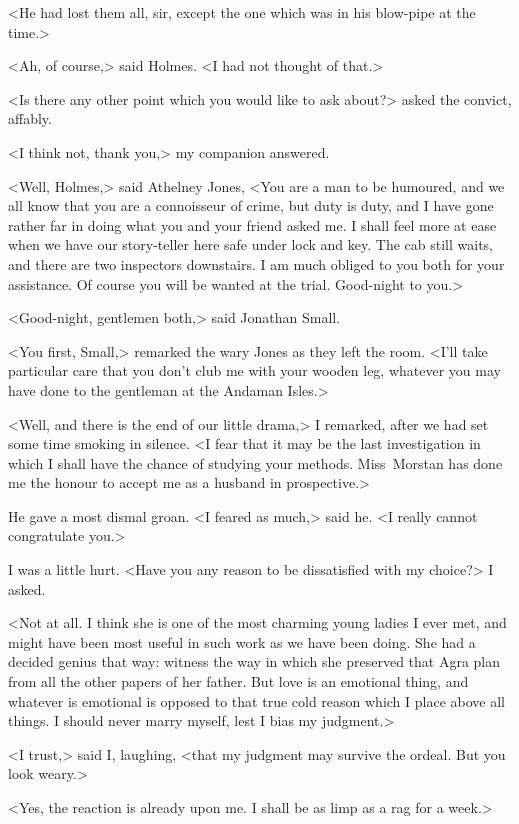 <He had lost them all, sir, except the one which was in his blow-pipe at the time.>

<Ah, of course,> said Holmes. <I had not thought of that.>

<Is there any other point which you would like to ask about?> asked the convict, affably.

<I think not, thank you,> my companion answered.

<Well, Holmes,> said Athelney Jones, <You are a man to be humoured, and we all know that you are a connoisseur of crime, but duty is duty, and I have gone rather far in doing what you and your friend asked me. I shall feel more at ease when we have our story-teller here safe under lock and key. The cab still waits, and there are two inspectors downstairs. I am much obliged to you both for your assistance. Of course you will be wanted at the trial. Good-night to you.>

<Good-night, gentlemen both,> said Jonathan Small.

<You first, Small,> remarked the wary Jones as they left the room. <I'll take particular care that you don't club me with your wooden leg, whatever you may have done to the gentleman at the Andaman Isles.>

<Well, and there is the end of our little drama,> I remarked, after we had set some time smoking in silence. <I fear that it may be the last investigation in which I shall have the chance of studying your methods. Miss~Morstan has done me the honour to accept me as a husband in prospective.>

He gave a most dismal groan. <I feared as much,> said he. <I really cannot congratulate you.>

I was a little hurt. <Have you any reason to be dissatisfied with my choice?> I asked.

<Not at all. I think she is one of the most charming young ladies I ever met, and might have been most useful in such work as we have been doing. She had a decided genius that way: witness the way in which she preserved that Agra plan from all the other papers of her father. But love is an emotional thing, and whatever is emotional is opposed to that true cold reason which I place above all things. I should never marry myself, lest I bias my judgment.>

<I trust,> said I, laughing, <that my judgment may survive the ordeal. But you look weary.>

<Yes, the reaction is already upon me. I shall be as limp as a rag for a week.>

